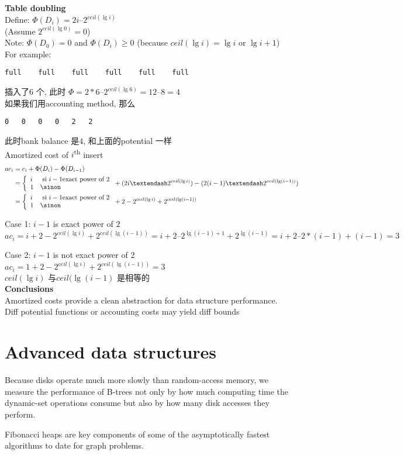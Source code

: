 \documentclass{article}
\begin{document}
\textbf{Table doubling}\\
Define: $\Phi(D_i) = 2i – 2^{ceil(\lg i)}$\\
(Assume $2^{ceil(\lg 0)} = 0$)\\
Note: $\Phi(D_0) = 0$ and $\Phi(D_i) \geq 0$ (because $ceil(\lg i) = \lg i$ or $\lg i + 1$)\\
For example:
\begin{verbatim}
full	full	full	full	full	full		
\end{verbatim}
插入了$6$ 个, 此时 $\Phi = 2*6 – 2^{ceil(\lg 6)} = 12 – 8 =4$\\
如果我们用accounting method, 那么
\begin{verbatim}
0	0	0	0	2	2		
\end{verbatim}
此时bank balance 是$4$, 和上面的potential 一样\\
Amortized cost of $i$\textsuperscript{th} insert
$$
\begin{aligned}
ac_i
&= c_i +\Phi(D_i) - \Phi(D_{i-1})\\
&=
\left\{
  \begin{array}{ll}
		  i & \si i-1 \mbox{exact power of } 2\\
		  1 & \sinon
  \end{array}
\right.
+ (2i – 2^{ceil(\lg i)}) - (2(i-1) – 2^{ceil(\lg (i-1))})\\
&=
\left\{
  \begin{array}{ll}
		  i & \si i-1 \mbox{exact power of } 2\\
		  1 & \sinon
  \end{array}
\right.
+ 2 - 2^{ceil(\lg i)} + 2^{ceil(\lg (i-1))}
\end{aligned}
$$

Case 1: $i -1$ is exact power of $2$
$$
ac_i = i + 2 - 2^{ceil(\lg i)} + 2^{ceil(\lg (i-1))}
= i + 2 – 2^{\lg (i-1) + 1} + 2^{\lg (i-1)} = i + 2 – 2*(i-1) + (i-1) = 3
$$

Case 2: $i -1$ is not exact power of $2$\\
$ac_i = 1 + 2 - 2^{ceil(\lg i)} + 2^{ceil(\lg (i-1))} = 3$\\
$ceil(\lg i)$ 与$ceil(\lg (i-1)$ 是相等的\\

\textbf{Conclusions}\\
Amortized costs provide a clean abstraction for data structure performance.\\
Diff potential functions or accounting costs may yield diff bounds

\section{Advanced data structures}
Because disks operate much more slowly than random-access memory, we measure the performance of B-trees not only by how much computing time the dynamic-set operations consume but also by how many disk accesses they perform.\par
Fibonacci heaps are key components of some of the asymptotically fastest algorithms to date for graph problems.
\end{document}
